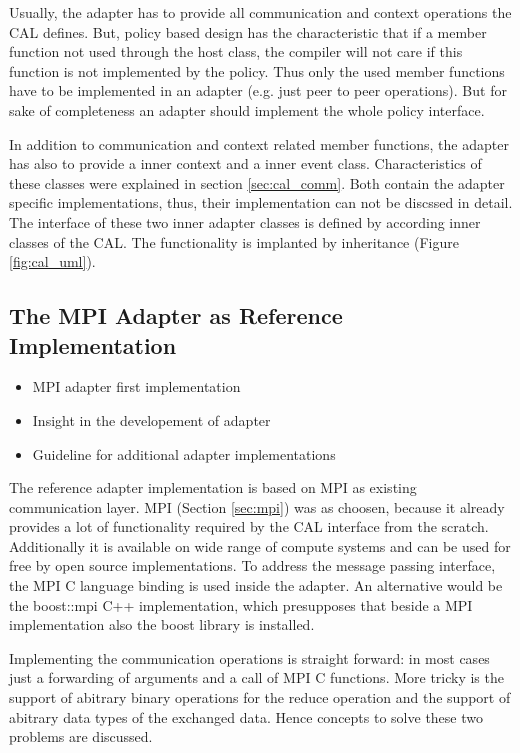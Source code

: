 Usually, the adapter has to provide all communication and context
operations the CAL defines. But, policy based design has the
characteristic that if a member function not used through the host
class, the compiler will not care if this function is not implemented
by the policy.  Thus only the used member functions have to be
implemented in an adapter (e.g. just peer to peer operations). But for
sake of completeness an adapter should implement the whole policy
interface.

In addition to communication and context related member functions, the
adapter has also to provide a inner context and a inner event
class. Characteristics of these classes were explained in section
\ref{sec:cal_comm}. Both contain the adapter specific implementations,
thus, their implementation can not be discssed in detail. The
interface of these two inner adapter classes is defined by according
inner classes of the CAL. The functionality is implanted by
inheritance (Figure \ref{fig:cal_uml}).


\subsection{The MPI Adapter as Reference Implementation}
\label{sec:cal_mpi_adapter}
\begin{itemize}
\item MPI adapter first implementation
\item Insight in the developement of adapter
\item Guideline for additional adapter implementations
\end{itemize}

The reference adapter implementation is based on MPI as existing
communication layer.  MPI (Section \ref{sec:mpi}) was as choosen,
because it already provides a lot of functionality required by the CAL
interface from the scratch. Additionally it is available on wide range
of compute systems and can be used for free by open source
implementations. To address the message passing interface, the MPI C
language binding is used inside the adapter. An alternative would be
the boost::mpi C++ implementation, which presupposes that beside a MPI
implementation also the boost library is installed.

Implementing the communication operations is straight forward: in most
cases just a forwarding of arguments and a call of MPI C
functions. More tricky is the support of abitrary binary operations
for the reduce operation and the support of abitrary data types of the
exchanged data. Hence concepts to solve these two problems are
discussed.

